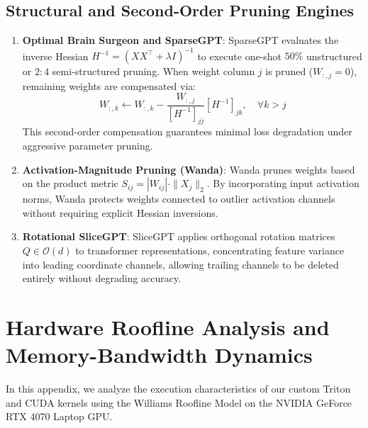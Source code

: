 \documentclass{article}
\begin{document}
\subsection{Structural and Second-Order Pruning Engines}
\begin{enumerate}
    \item \textbf{Optimal Brain Surgeon and SparseGPT}:
    SparseGPT \citep{frantar2022sparsegpt} evaluates the inverse Hessian $H^{-1} = (X X^\top + \lambda I)^{-1}$ to execute one-shot $50\%$ unstructured or $2:4$ semi-structured pruning. When weight column $j$ is pruned ($W_{:, j} = 0$), remaining weights are compensated via:
    \begin{equation}
        W_{:, k} \leftarrow W_{:, k} - \frac{W_{:, j}}{[H^{-1}]_{jj}} [H^{-1}]_{jk}, \quad \forall k > j
    \end{equation}
    This second-order compensation guarantees minimal loss degradation under aggressive parameter pruning.
    \item \textbf{Activation-Magnitude Pruning (Wanda)}:
    Wanda \citep{sun2024wanda} prunes weights based on the product metric $S_{ij} = |W_{ij}| \cdot \|X_j\|_2$. By incorporating input activation norms, Wanda protects weights connected to outlier activation channels without requiring explicit Hessian inversions.
    \item \textbf{Rotational SliceGPT}:
    SliceGPT \citep{ashkboos2024slicegpt} applies orthogonal rotation matrices $Q \in \mathcal{O}(d)$ to transformer representations, concentrating feature variance into leading coordinate channels, allowing trailing channels to be deleted entirely without degrading accuracy.
\end{enumerate}

\section{Hardware Roofline Analysis and Memory-Bandwidth Dynamics}
\label{app:roofline_analysis}
In this appendix, we analyze the execution characteristics of our custom Triton and CUDA kernels using the Williams Roofline Model on the NVIDIA GeForce RTX 4070 Laptop GPU.
\end{document}
